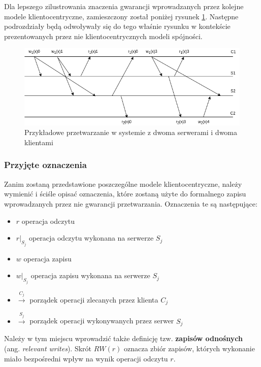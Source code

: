 Dla lepszego zilustrowania znaczenia gwarancji wprowadzanych przez kolejne modele klientocentryczne, zamieszczony został poniżej rysunek \ref{figure:replication_sess_gu}. Następne podrozdziały będą odwoływały się do tego właśnie rysunku w kontekście prezentowanych przez nie klientocentrycznych modeli spójności.

\begin{figure}[H]
    \includegraphics[width=\linewidth]{images/02-sess_gu.png}
    \caption{Przykładowe przetwarzanie w systemie z dwoma serwerami i dwoma klientami}
    \label{figure:replication_sess_gu}
\end{figure}

\subsubsection{Przyjęte oznaczenia}

Zanim zostaną przedstawione poszczególne modele klientocentryczne, należy wymienić i ściśle opisać oznaczenia, które zostaną użyte do formalnego zapisu wprowadzanych przez nie gwarancji przetwarzania. Oznaczenia te są następujące:

\begin{itemize}
    \item $ r $ operacja odczytu
    \item $ r|_{S_j} $ operacja odczytu wykonana na serwerze $ S_j $
    \item $ w $ operacja zapisu
    \item $ w|_{S_j} $ operacja zapisu wykonana na serwerze $ S_j $
    \item $ \xrightarrow{C_j} $ porządek operacji zlecanych przez klienta $ C_j $
    \item $ \xrightarrow{S_j} $ porządek operacji wykonywanych przez serwer $ S_j $
\end{itemize}

Należy w tym miejscu wprowadzić także definicję tzw. \textbf{zapisów odnośnych} (ang. \textit{relevant writes}). Skrót $ RW(r) $ oznacza zbiór zapisów, których wykonanie miało bezpośredni wpływ na wynik operacji odczytu $ r $.

